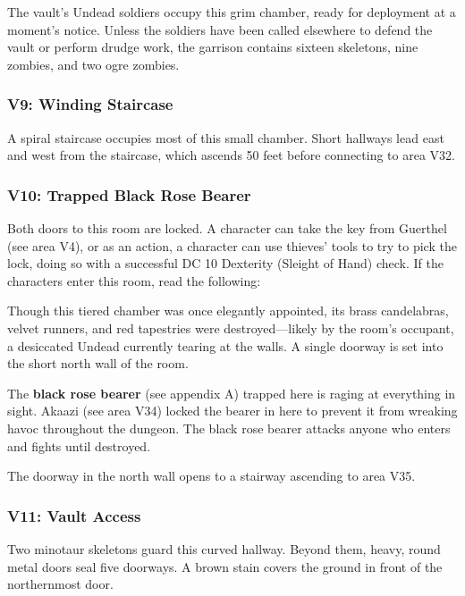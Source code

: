 \documentclass[10pt,a4paper,twoside,bg=print,twocolumn,openany,nodeprecatedcode]{dndbook}
\begin{document}
The vault's Undead soldiers occupy this grim chamber, ready for deployment at a moment's notice. Unless the soldiers have been called elsewhere to defend the vault or perform drudge work, the garrison contains sixteen skeletons, nine zombies, and two ogre zombies.

\subsubsection{V9: Winding Staircase}
A spiral staircase occupies most of this small chamber. Short hallways lead east and west from the staircase, which ascends 50 feet before connecting to area V32.

\subsubsection{V10: Trapped Black Rose Bearer}
Both doors to this room are locked. A character can take the key from Guerthel (see area V4), or as an action, a character can use thieves' tools to try to pick the lock, doing so with a successful DC 10 Dexterity (Sleight of Hand) check. If the characters enter this room, read the following:

\begin{DndReadAloud}{}
Though this tiered chamber was once elegantly appointed, its brass candelabras, velvet runners, and red tapestries were destroyed—likely by the room's occupant, a desiccated Undead currently tearing at the walls. A single doorway is set into the short north wall of the room.

\end{DndReadAloud}

The \textbf{black rose bearer} (see appendix A) trapped here is raging at everything in sight. Akaazi (see area V34) locked the bearer in here to prevent it from wreaking havoc throughout the dungeon. The black rose bearer attacks anyone who enters and fights until destroyed.

The doorway in the north wall opens to a stairway ascending to area V35.

\subsubsection{V11: Vault Access}
\begin{DndReadAloud}{}
Two minotaur skeletons guard this curved hallway. Beyond them, heavy, round metal doors seal five doorways. A brown stain covers the ground in front of the northernmost door.

\end{DndReadAloud}
\end{document}
